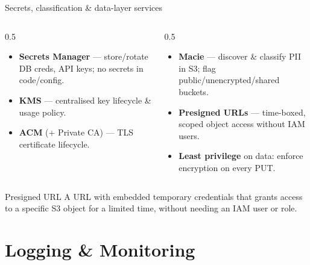 \documentclass[aspectratio=169,10pt]{beamer}
\newcommand{\svc}[1]{{\color{accent}\textsf{\textbf{#1}}}}      %
\newcommand{\term}[1]{{\color{awsink}\textbf{#1}}}
\begin{document}
\begin{frame}{Secrets, classification \& data-layer services}
  \footnotesize
  \begin{columns}[T]
    \begin{column}{0.5\textwidth}
      \begin{itemize}
        \item \svc{Secrets Manager} --- store/rotate DB creds, API keys; no secrets in code/config.
        \item \svc{KMS} --- centralised key lifecycle \& usage policy.
        \item \svc{ACM} (+ Private CA) --- TLS certificate lifecycle.
      \end{itemize}
    \end{column}
    \begin{column}{0.5\textwidth}
      \begin{itemize}
        \item \svc{Macie} --- discover \& classify PII in S3; flag public/unencrypted/shared buckets.
        \item \term{Presigned URLs} --- time-boxed, scoped object access without IAM users.
        \item \term{Least privilege} on data: enforce encryption on every PUT.
      \end{itemize}
    \end{column}
  \end{columns}
  \vfill
  \begin{block}{\footnotesize Presigned URL}
    \footnotesize A URL with embedded temporary credentials that grants access to a specific S3 object for a limited time, without needing an IAM user or role.
    
    

  \end{block}
\end{frame}

\section{Logging \& Monitoring}
\end{document}
